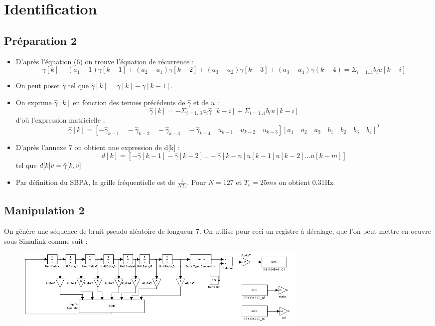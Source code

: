 \documentclass[../../Cours_M1.tex]{subfiles}
\begin{document}
\section{Identification}
\subsection*{Préparation 2}

\begin{itemize}

\item D'après l'équation (6) on trouve l'équation de récurrence : \[\gamma[k] + (a_1-1)\gamma[k-1] + (a_2-a_1)\gamma[k-2] + (a_3-a_2)\gamma[k-3] + (a_3-a_4)\gamma(k-4) = \Sigma_{i=1..4}b_iu[k-i]\]

\item On peut poser $\hat{\gamma}$ tel que $\hat{\gamma}[k] = \gamma[k] - \gamma[k-1]$.

\item On exprime $\hat{\gamma}[k]$ en fonction des termes précédents de $\hat{\gamma}$ et de $u$ :
\[\hat{\gamma}[k] = -\Sigma_{i=1..3}a_i\hat{\gamma}[k-i] + \Sigma_{i=1..4}b_iu[k-i]\]
d'où l'expression matricielle :
\[\hat{\gamma}[k] = \left[ -\hat{\gamma}_{k-1} \quad -\hat{\gamma}_{k-2} \quad -\hat{\gamma}_{k-3} \quad -\hat{\gamma}_{k-4} \quad u_{k-1} \quad u_{k-2} \quad u_{k-3}\right] \left[a_1 \quad a_2 \quad a_3 \quad b_1 \quad b_2 \quad b_3 \quad b_4\right]^{T} \]

\item D'après l'annexe 7 on obtient une expression de d[k] : \[d[k] = \left[-\hat{\gamma}[k-1] -\hat{\gamma}[k-2] ... -\hat{\gamma}[k-n] u[k-1] u[k-2] ... u[k-m]\right] \]
tel que $d[k]v = \hat{\gamma}\*[k,v]$

\item Par définition du SBPA, la grille fréquentielle est de $\frac{1}{NT_e}$. Pour $N=127$ et $T_e = 25ms$ on obtient 0.31Hz.

\end{itemize}

\subsection*{Manipulation 2}

On génère une séquence de bruit pseudo-aléatoire de longueur 7. On utilise pour ceci un registre à décalage, que l'on peut mettre en oeuvre sous Simulink comme suit :

\begin{figure}
\begin{center}
\includegraphics[width=0.7\textwidth]{SBPA.PNG}
\end{center}
\end{figure}
\end{document}
